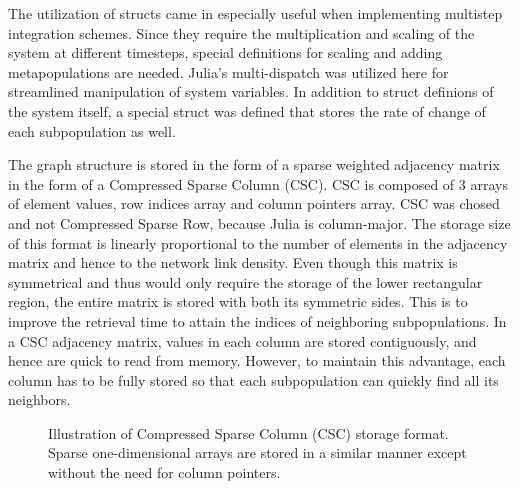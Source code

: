 The utilization of structs came in especially useful when implementing multistep integration schemes. Since they require the multiplication and scaling of the system at different timesteps, special definitions for scaling and adding metapopulations are needed. Julia's multi-dispatch was utilized here for streamlined manipulation of system variables. In addition to struct definions of the system itself, a special struct was defined that stores the rate of change of each subpopulation as well.

The graph structure is stored in the form of a sparse weighted adjacency matrix in the form of a Compressed Sparse Column (CSC).  CSC is composed of 3 arrays of element values, row indices array and column pointers array. CSC was chosed and not Compressed Sparse Row, because Julia is column-major. The storage size of this format is linearly proportional to the number of elements in the adjacency matrix and hence to the network link density. Even though this matrix is symmetrical and thus would only require the storage of the lower rectangular region, the entire matrix is stored with both its symmetric sides. This is to improve the retrieval time to attain the indices of neighboring subpopulations. In a CSC adjacency matrix, values in each column are stored contiguously, and hence are quick to read from memory. However, to maintain this advantage, each column has to be fully stored so that each subpopulation can quickly find all its neighbors.\\
\usetikzlibrary{matrix}
\usetikzlibrary{positioning}
\begin{figure}[htbp]
	\centering

	\caption{Illustration of Compressed Sparse Column (CSC) storage format. Sparse one-dimensional arrays are stored in a similar manner except without the need for column pointers.}
	\end{figure}
